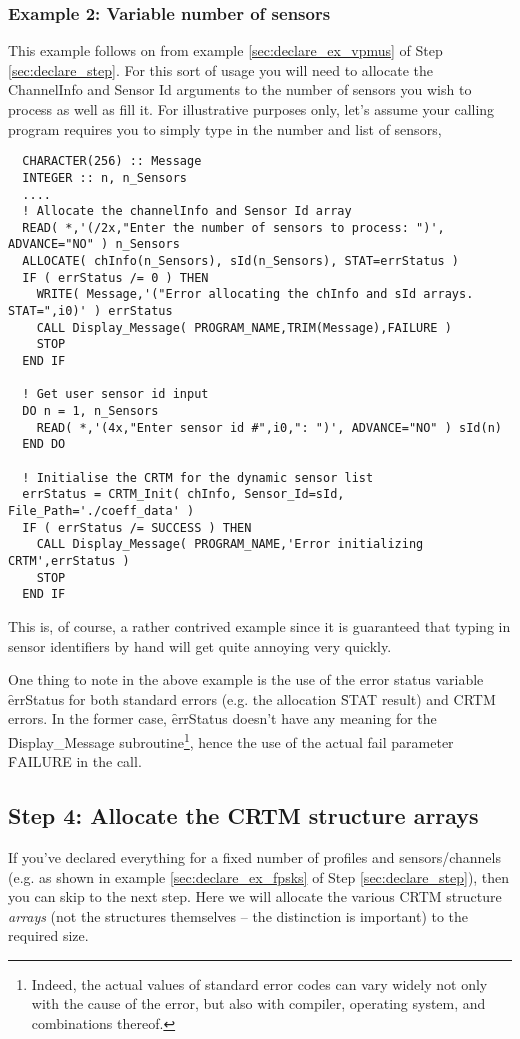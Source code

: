 \subsubsection{Example 2: Variable number of sensors}
This example follows on from example \ref{sec:declare_ex_vpmus} of Step \ref{sec:declare_step}. For this sort of usage you will need to allocate the ChannelInfo and Sensor Id arguments to the number of sensors you wish to process as well as fill it. For illustrative purposes only, let's assume your calling program requires you to simply type in the number and list of sensors,
\begin{ttfamily}
  \begin{verbatim}
  CHARACTER(256) :: Message
  INTEGER :: n, n_Sensors
  ....
  ! Allocate the channelInfo and Sensor Id array
  READ( *,'(/2x,"Enter the number of sensors to process: ")', ADVANCE="NO" ) n_Sensors
  ALLOCATE( chInfo(n_Sensors), sId(n_Sensors), STAT=errStatus )
  IF ( errStatus /= 0 ) THEN
    WRITE( Message,'("Error allocating the chInfo and sId arrays. STAT=",i0)' ) errStatus
    CALL Display_Message( PROGRAM_NAME,TRIM(Message),FAILURE )
    STOP
  END IF
  
  ! Get user sensor id input
  DO n = 1, n_Sensors
    READ( *,'(4x,"Enter sensor id #",i0,": ")', ADVANCE="NO" ) sId(n)
  END DO
  
  ! Initialise the CRTM for the dynamic sensor list
  errStatus = CRTM_Init( chInfo, Sensor_Id=sId, File_Path='./coeff_data' )
  IF ( errStatus /= SUCCESS ) THEN 
    CALL Display_Message( PROGRAM_NAME,'Error initializing CRTM',errStatus )
    STOP
  END IF\end{verbatim}
\end{ttfamily}
This is, of course, a rather contrived example since it is guaranteed that typing in sensor identifiers by hand will get quite annoying very quickly.

One thing to note in the above example is the use of the error status variable \f{errStatus} for both standard errors (e.g. the allocation \f{STAT} result) and CRTM errors. In the former case, \f{errStatus} doesn't have any meaning for the \f{Display\_Message} subroutine\footnote{Indeed, the actual values of standard error codes can vary widely not only with the cause of the error, but also with compiler, operating system, and combinations thereof.}, hence the use of the actual fail parameter \f{FAILURE} in the call.


\subsection{Step 4: Allocate the CRTM structure arrays}
If you've declared everything for a fixed number of profiles and sensors/channels (e.g. as shown in example \ref{sec:declare_ex_fpsks} of Step \ref{sec:declare_step}), then you can skip to the next step. Here we will allocate the various CRTM structure \textit{arrays} (not the structures themselves -- the distinction is important) to the required size.

